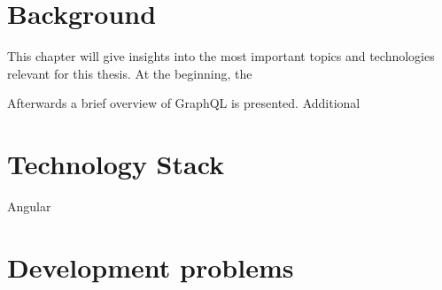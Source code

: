 \chapter{Background}

This chapter will give insights into the most important topics and technologies relevant for this thesis. At the beginning, the 

Afterwards a brief overview of GraphQL is presented. Additional









\chapter{Technology Stack}

Angular

\chapter{Development problems}
